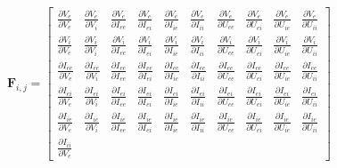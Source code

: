 \documentclass[12pt,twoside]{article}
\begin{document}
\[
\mathbf{F}_{i,j} =
\begin{bmatrix}
  \frac{\partial V_e}{\partial V_e} & 
    \frac{\partial V_e}{\partial V_i} & 
    \frac{\partial V_e}{\partial I_{ee}} &
    \frac{\partial V_e}{\partial I_{ei}} &
    \frac{\partial V_e}{\partial I_{ie}} &
    \frac{\partial V_e}{\partial I_{ii}} &
    \frac{\partial V_e}{\partial U_{ee}} &
    \frac{\partial V_e}{\partial U_{ei}} &
    \frac{\partial V_e}{\partial U_{ie}} &
    \frac{\partial V_e}{\partial U_{ii}} \\[1ex] %
  \frac{\partial V_i}{\partial V_e} & 
    \frac{\partial V_i}{\partial V_i} & 
    \frac{\partial V_i}{\partial I_{ee}} &
    \frac{\partial V_i}{\partial I_{ei}} &
    \frac{\partial V_i}{\partial I_{ie}} &
    \frac{\partial V_i}{\partial I_{ii}} &
    \frac{\partial V_i}{\partial U_{ee}} &
    \frac{\partial V_i}{\partial U_{ei}} &
    \frac{\partial V_i}{\partial U_{ie}} &
    \frac{\partial V_i}{\partial U_{ii}} \\[1ex]
  \frac{\partial I_{ee}}{\partial V_e} & 
    \frac{\partial I_{ee}}{\partial V_i} & 
    \frac{\partial I_{ee}}{\partial I_{ee}} &
    \frac{\partial I_{ee}}{\partial I_{ei}} &
    \frac{\partial I_{ee}}{\partial I_{ie}} &
    \frac{\partial I_{ee}}{\partial I_{ii}} &
    \frac{\partial I_{ee}}{\partial U_{ee}} &
    \frac{\partial I_{ee}}{\partial U_{ei}} &
    \frac{\partial I_{ee}}{\partial U_{ie}} &
    \frac{\partial I_{ee}}{\partial U_{ii}} \\[1ex]
  \frac{\partial I_{ei}}{\partial V_e} & 
    \frac{\partial I_{ei}}{\partial V_i} & 
    \frac{\partial I_{ei}}{\partial I_{ee}} &
    \frac{\partial I_{ei}}{\partial I_{ei}} &
    \frac{\partial I_{ei}}{\partial I_{ie}} &
    \frac{\partial I_{ei}}{\partial I_{ii}} &
    \frac{\partial I_{ei}}{\partial U_{ee}} &
    \frac{\partial I_{ei}}{\partial U_{ei}} &
    \frac{\partial I_{ei}}{\partial U_{ie}} &
    \frac{\partial I_{ei}}{\partial U_{ii}} \\[1ex]
  \frac{\partial I_{ie}}{\partial V_e} & 
    \frac{\partial I_{ie}}{\partial V_i} & 
    \frac{\partial I_{ie}}{\partial I_{ee}} &
    \frac{\partial I_{ie}}{\partial I_{ei}} &
    \frac{\partial I_{ie}}{\partial I_{ie}} &
    \frac{\partial I_{ie}}{\partial I_{ii}} &
    \frac{\partial I_{ie}}{\partial U_{ee}} &
    \frac{\partial I_{ie}}{\partial U_{ei}} &
    \frac{\partial I_{ie}}{\partial U_{ie}} &
    \frac{\partial I_{ie}}{\partial U_{ii}} \\[1ex]
  \frac{\partial I_{ii}}{\partial V_e} & 

\end{bmatrix}\]
\end{document}
